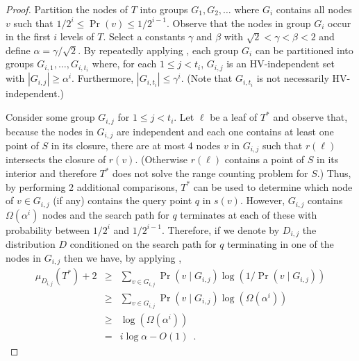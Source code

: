 \documentclass[charterfonts]{patmorin}
\begin{document}
\begin{proof}
Partition the nodes of $T$ into groups $G_1,G_2,\ldots$ where $G_i$
contains all nodes $v$ such that $1/2^{i} \le \Pr(v) \le 1/2^{i-1}$.
Observe that the nodes in group $G_i$ occur in the first $i$ levels of
$T$.  Select a constants $\gamma$ and $\beta$ with $\sqrt{2} < \gamma
< \beta < 2$ and define $\alpha=\gamma/\sqrt{2}$.  By
repeatedly applying , each group $G_i$ can be
partitioned into groups $G_{i,1},\ldots,G_{i,t_i}$ where, for each $1
\le j < t_i$, $G_{i,j}$ is an HV-independent set with $|G_{i,j}|
\ge \alpha^i$.  Furthermore, $|G_{i,t_i}| \le \gamma^i$. (Note that
$G_{i,t_i}$ is not necessarily HV-independent.)

Consider some group $G_{i,j}$ for $1\le j < t_i$.  Let $\ell$ be a
leaf of $T^*$ and observe that, because the nodes in $G_{i,j}$ are
independent and each one contains at least one point of $S$ in its
closure, there are at most 4 nodes $v$ in $G_{i,j}$ such that
$r(\ell)$ intersects the closure of $r(v)$.  (Otherwise $r(\ell)$
contains a point of $S$ in its interior and therefore $T^*$ does not
solve the range counting problem for $S$.) Thus, by performing 2 
additional comparisons, $T^*$ can be used to determine which node of
$v\in G_{i,j}$ (if any) contains the query point $q$ in $s(v)$.
However, $G_{i,j}$ contains $\Omega(\alpha^i)$ nodes and the search
path for $q$ terminates at each of these with probability between
$1/2^i$ and $1/2^{i-1}$.  Therefore, if we denote by $D_{i,j}$ the
distribution $D$ conditioned on the search path for $q$ terminating in
one of the nodes in $G_{i,j}$ then we have, by applying
,
\begin{eqnarray*}
   \mu_{D_{i,j}}(T^*) + 2 
    & \ge & \sum_{v\in G_{i,j}}\Pr(v\mid G_{i,j})\log(1/\Pr(v\mid G_{i,j})) \\
    & \ge & \sum_{v\in G_{i,j}}\Pr(v\mid G_{i,j})\log(\Omega(\alpha^i)) \\
    & \ge & \log(\Omega(\alpha^i)) \\
    & = & i\log\alpha - O(1) \enspace .
\end{eqnarray*}


\end{proof}
\end{document}
